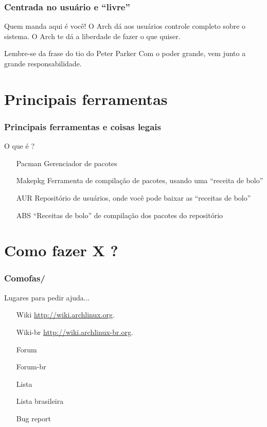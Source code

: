 \documentclass{beamer}
\begin{document}
\begin{frame}
    \frametitle{Centrada no usuário e ``livre''}
    \begin{block}{Quem manda aqui é você!}
        O Arch dá aos usuários controle completo sobre o sistema. O Arch te dá a liberdade de fazer o que quiser.
    \end{block}
    \begin{block}{Lembre-se da frase do tio do Peter Parker}
        Com o poder grande, vem junto a grande responsabilidade.
    \end{block}
\end{frame}



\section{Principais ferramentas}

\begin{frame}[fragile]
        \frametitle{Principais ferramentas e coisas legais}
        \begin{block}{O que é ?}
            \begin{itemize}
                \centering
                \item[Pacman] Gerenciador de pacotes
                \item[Makepkg] Ferramenta de compilação de pacotes, usando uma ``receita de bolo''
                \item[AUR] Repositório de usuários, onde você pode baixar as ``receitas de bolo''
                \item[ABS] ``Receitas de bolo'' de compilação dos pacotes do repositório
            \end{itemize}
        \end{block}
\end{frame}

\section{Como fazer X ? }

\begin{frame}
    \frametitle{Comofas/}
    \begin{block}{Lugares para pedir ajuda...}
        \begin{itemize}
            \centering
            \item[Wiki] \url{http://wiki.archlinux.org}. 
            \item[Wiki-br] \url{http://wiki.archlinux-br.org}. 
            \item[Forum] %
            \item[Forum-br] %
            \item[Lista] %
            \item[Lista brasileira] %
            \item[Bug report] %
        \end{itemize}
    \end{block}        

\end{frame}
\end{document}
